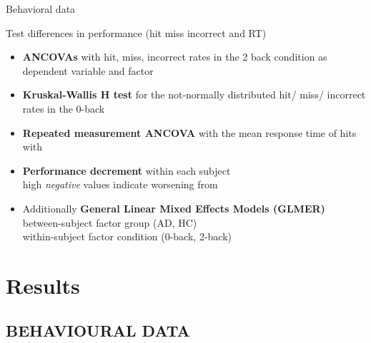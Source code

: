 \documentclass{bredelebeamer}
\begin{document}
\begin{frame}{Behavioral data}
\begin{block}{Test differences in performance (hit miss incorrect and  RT)}
\small
\begin{itemize}
\item \textbf{ANCOVAs} with hit, miss, incorrect rates in the 2 back condition as dependent variable and factor %
\item \textbf{Kruskal-Wallis H test} for the not-normally distributed hit/ miss/ incorrect rates in the 0-back %
\item \textbf{Repeated measurement ANCOVA} with the mean response time of hits with
\item \textbf{Performance decrement} within each subject\\ high \textit{negative} values indicate worsening from %
\item Additionally \textbf{General Linear Mixed Effects Models (GLMER)} \\
between-subject factor group (AD, HC) \\
within-subject factor condition (0-back, 2-back)
    \end{itemize}
    \end{block}
\end{frame}




\section{Results}
\subsection{BEHAVIOURAL DATA}
\end{document}
